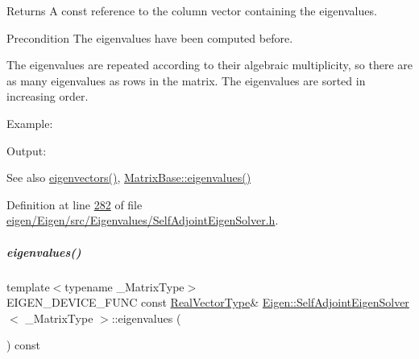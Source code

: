 \begin{DoxyReturn}{Returns}
A const reference to the column vector containing the eigenvalues.
\end{DoxyReturn}
\begin{DoxyPrecond}{Precondition}
The eigenvalues have been computed before.
\end{DoxyPrecond}
The eigenvalues are repeated according to their algebraic multiplicity, so there are as many eigenvalues as rows in the matrix. The eigenvalues are sorted in increasing order.

Example\+: 
\begin{DoxyCodeInclude}
\end{DoxyCodeInclude}
 Output\+: 
\begin{DoxyVerbInclude}
\end{DoxyVerbInclude}


\begin{DoxySeeAlso}{See also}
\hyperlink{group___eigenvalues___module_a7b9f7e641fa46ac4c5f2371405c69b2b}{eigenvectors()}, \hyperlink{group___core___module_a30430fa3d5b4e74d312fd4f502ac984d}{Matrix\+Base\+::eigenvalues()} 
\end{DoxySeeAlso}


Definition at line \hyperlink{eigen_2_eigen_2src_2_eigenvalues_2_self_adjoint_eigen_solver_8h_source_l00282}{282} of file \hyperlink{eigen_2_eigen_2src_2_eigenvalues_2_self_adjoint_eigen_solver_8h_source}{eigen/\+Eigen/src/\+Eigenvalues/\+Self\+Adjoint\+Eigen\+Solver.\+h}.

\mbox{\label{group___eigenvalues___module_a8efab27e82aa6aa0ae0c64739238c2e0}} 
\subparagraph{\texorpdfstring{eigenvalues()}{eigenvalues()}\hspace{0.1cm}{\footnotesize\ttfamily [2/2]}}
{\footnotesize\ttfamily template$<$typename \+\_\+\+Matrix\+Type$>$ \\
E\+I\+G\+E\+N\+\_\+\+D\+E\+V\+I\+C\+E\+\_\+\+F\+U\+NC const \hyperlink{group___eigenvalues___module_acd090d5fdfc3cc017a13b6d8daa92287}{Real\+Vector\+Type}\& \hyperlink{group___eigenvalues___module_class_eigen_1_1_self_adjoint_eigen_solver}{Eigen\+::\+Self\+Adjoint\+Eigen\+Solver}$<$ \+\_\+\+Matrix\+Type $>$\+::eigenvalues (\begin{DoxyParamCaption}{ }\end{DoxyParamCaption}) const\hspace{0.3cm}{\ttfamily [inline]}}




